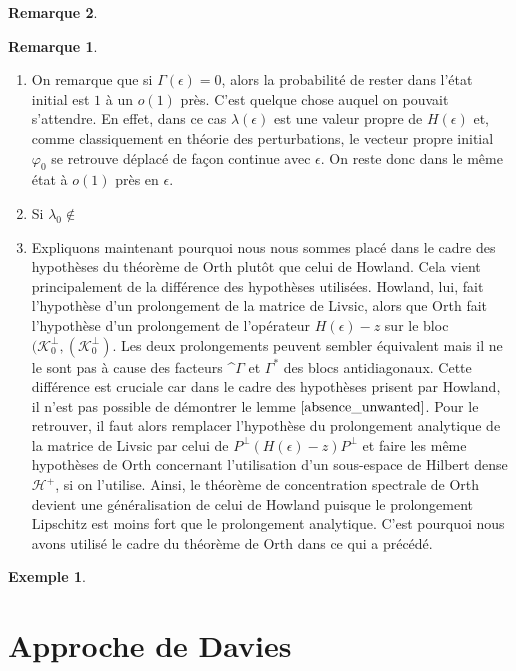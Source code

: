 \documentclass[12pt,openany,a4paper, titlepage]{article}
\newcommand{\HH}{\mathcal{H}}
\newcommand{\vp}{\varphi}
\theoremstyle{definition}
\theoremstyle{definition}
\theoremstyle{definition}
\newtheorem{ex}{Exemple}
\theoremstyle{definition}
\theoremstyle{definition}
\newtheorem{rem}{Remarque}
\theoremstyle{definition}
\begin{document}
\begin{rem}
\begin{rem}
\begin{enumerate}
    \item On remarque que si $\Gamma(\epsilon) = 0$, alors la probabilité de rester dans l'état initial est $1$ à un $o(1)$ près. C'est quelque chose auquel on pouvait s'attendre. En effet, dans ce cas $\lambda(\epsilon)$ est une valeur propre de $H(\epsilon)$ et, comme classiquement en théorie des perturbations, le vecteur propre initial $\vp_0$ se retrouve déplacé de façon continue avec $\epsilon$. On reste donc dans le même état à $o(1)$ près en $\epsilon$.
    \item Si $\lambda_0\notin $
    \item Expliquons maintenant pourquoi nous nous sommes placé dans le cadre des hypothèses du théorème de Orth plutôt que celui de Howland. Cela vient principalement de la différence des hypothèses utilisées. Howland, lui, fait l'hypothèse d'un prolongement de la matrice de Livsic, alors que Orth fait l'hypothèse d'un prolongement de l'opérateur $H(\epsilon) - z $ sur le bloc $(\mathcal{K}_0^\perp,(\mathcal{K}_0^\perp)$. Les deux prolongements peuvent sembler équivalent mais il ne le sont pas à cause des facteurs ^$\Gamma$ et $\Gamma^*$ des blocs antidiagonaux. Cette différence est cruciale car dans le cadre des hypothèses prisent par Howland, il n'est pas possible de démontrer le lemme $\ref{absence_unwanted}$. Pour le retrouver, il faut alors remplacer l'hypothèse du prolongement analytique de la matrice de Livsic par celui de $P^\perp(H(\epsilon) - z)P^\perp$ et faire les même hypothèses de Orth concernant l'utilisation d'un sous-espace de Hilbert dense $\HH^+$, si on l'utilise. Ainsi, le théorème de concentration spectrale de Orth devient une généralisation de celui de Howland puisque le prolongement Lipschitz est moins fort que le prolongement analytique. C'est pourquoi nous avons utilisé le cadre du théorème de Orth dans ce qui a précédé.
\end{enumerate}
    
\end{rem}

\begin{ex}
    
\end{ex}

\newpage
\section{Approche de Davies}


\end{rem}
\end{document}
